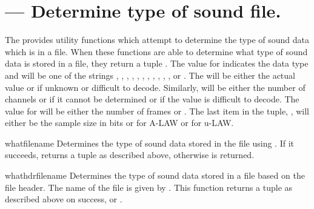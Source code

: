 \section{ ---
         Determine type of sound file.}



The  provides utility functions which attempt to
determine the type of sound data which is in a file.  When these
functions are able to determine what type of sound data is stored in a
file, they return a tuple .  The value for
 indicates the data type and will be one of the strings
, , , ,
, , , ,
, , , or .  The
 will be either the actual value or  if
unknown or difficult to decode.  Similarly,  will be
either the number of channels or  if it cannot be determined
or if the value is difficult to decode.  The value for 
will be either the number of frames or .  The last item in
the tuple, , will either be the sample size in
bits or  for A-LAW or  for
u-LAW.


\begin{funcdesc}{what}{filename}
  Determines the type of sound data stored in the file 
  using .  If it succeeds, returns a tuple as
  described above, otherwise  is returned.
\end{funcdesc}


\begin{funcdesc}{whathdr}{filename}
  Determines the type of sound data stored in a file based on the file 
  header.  The name of the file is given by .  This
  function returns a tuple as described above on success, or
  .
\end{funcdesc}
